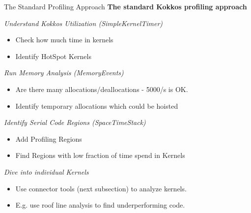 \begin{frame}[fragile]{The Standard Profiling Approach}
\textbf{The standard Kokkos profiling approach}

\vspace{10pt}
\textit{Understand Kokkos Utilization (SimpleKernelTimer)}
\begin{itemize}
  \item Check how much time in kernels
  \item Identify HotSpot Kernels
\end{itemize}

\textit{Run Memory Analysis (MemoryEvents)}
\begin{itemize}
  \item Are there many allocations/deallocations - 5000/s is OK.
  \item Identify temporary allocations which could be hoisted
\end{itemize}


\textit{Identify Serial Code Regions (SpaceTimeStack)}
\begin{itemize}
  \item Add Profiling Regions
  \item Find Regions with low fraction of time spend in Kernels
\end{itemize}

\textit{Dive into individual Kernels}
\begin{itemize}
  \item Use connector tools (next subsection) to analyze kernels.
  \item E.g. use roof line analysis to find underperforming code.
\end{itemize}
\end{frame}


